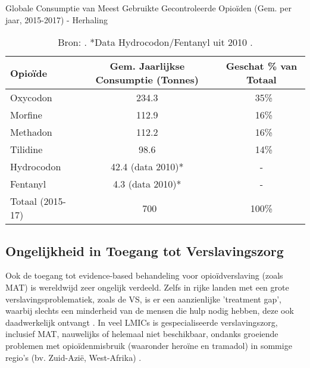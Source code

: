 \documentclass[11pt, a4paper]{report} %
\begin{document}
\begin{table}[htbp]
    \centering
    \caption{Globale Consumptie van Meest Gebruikte Gecontroleerde Opioïden (Gem. per jaar, 2015-2017) - Herhaling}
    \label{tab:global_consumption_repeat}
    \begin{tabular}{l c c}
        \toprule
        Opioïde      & Gem. Jaarlijkse Consumptie (Tonnes) & Geschat \% van Totaal \\
        \midrule
        Oxycodon     & 234.3                               & ~35\%                 \\
        Morfine      & 112.9                               & ~16\%                 \\
        Methadon     & 112.2                               & ~16\%                 \\
        Tilidine     & 98.6                                & ~14\%                 \\
        Hydrocodon   & 42.4 (data 2010)*                   & -                     \\
        Fentanyl     & 4.3 (data 2010)*                    & -                     \\
        \midrule
        Totaal (2015-17) & ~700                            & 100\%                 \\
        \bottomrule
    \end{tabular}
    \caption*{\footnotesize Bron: \parencite{PMCID8801686GlobalConsumption}. *Data Hydrocodon/Fentanyl uit 2010 \parencite{UNODC2010WDR}.}
\end{table}

\subsection{Ongelijkheid in Toegang tot Verslavingszorg}
Ook de toegang tot evidence-based behandeling voor opioïdverslaving (zoals MAT) is wereldwijd zeer ongelijk verdeeld. Zelfs in rijke landen met een grote verslavingsproblematiek, zoals de VS, is er een aanzienlijke 'treatment gap', waarbij slechts een minderheid van de mensen die hulp nodig hebben, deze ook daadwerkelijk ontvangt \parencite{SAMHSA2022NSDUH}. In veel LMICs is gespecialiseerde verslavingszorg, inclusief MAT, nauwelijks of helemaal niet beschikbaar, ondanks groeiende problemen met opioïdenmisbruik (waaronder heroïne en tramadol) in sommige regio's (bv. Zuid-Azië, West-Afrika) \parencite{EUDAHeroinGlobal}.
\end{document}
